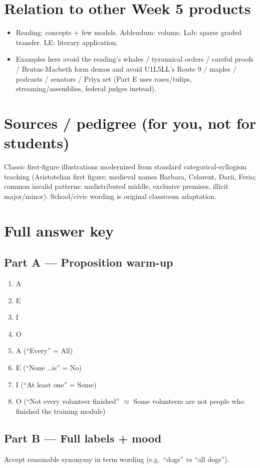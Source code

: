 \documentclass[11pt]{article}
\begin{document}
\section{Relation to other Week 5 products}
\begin{itemize}
\item Reading: concepts + few models. Addendum: volume. Lab: sparse graded transfer. LE: literary application.
\item Examples here avoid the reading's whales / tyrannical orders / careful proofs / Brutus-Macbeth form demos and avoid U1L5LL's Route 9 / maples / podcasts / senators / Priya set (Part E uses roses/tulips, streaming/assemblies, federal judges instead).
\end{itemize}

\section{Sources / pedigree (for you, not for students)}
Classic first-figure illustrations modernized from standard categorical-syllogism teaching (Aristotelian first figure; medieval names Barbara, Celarent, Darii, Ferio; common invalid patterns: undistributed middle, exclusive premises, illicit major/minor). School/civic wording is original classroom adaptation.

\newpage
\section{Full answer key}

\subsection*{Part A --- Proposition warm-up}
\begin{enumerate}
\item A
\item E
\item I
\item O
\item A \quad (``Every'' = All)
\item E \quad (``None \ldots is'' = No)
\item I \quad (``At least one'' = Some)
\item O \quad (``Not every volunteer finished'' $\approx$ Some volunteers are not people who finished the training module)
\end{enumerate}

\subsection*{Part B --- Full labels + mood}
\noindent Accept reasonable synonymy in term wording (e.g.\ ``dogs'' vs ``all dogs'').
\end{document}
